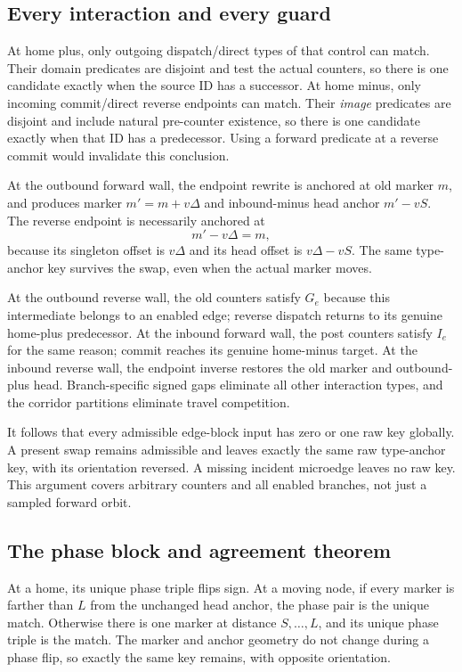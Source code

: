 \documentclass[11pt,a4paper]{article}
\numberwithin{equation}{section}
\begin{document}
\subsection{Every interaction and every guard}
At home plus, only outgoing dispatch/direct types of that control can match. Their domain predicates are disjoint and test the actual counters, so there is one candidate exactly when the source ID has a successor. At home minus, only incoming commit/direct reverse endpoints can match. Their \emph{image} predicates are disjoint and include natural pre-counter existence, so there is one candidate exactly when that ID has a predecessor. Using a forward predicate at a reverse commit would invalidate this conclusion.

At the outbound forward wall, the endpoint rewrite is anchored at old marker $m$, and produces marker $m'=m+v\Delta$ and inbound-minus head anchor $m'-vS$. The reverse endpoint is necessarily anchored at
\[
 m'-v\Delta=m,
\]
because its singleton offset is $v\Delta$ and its head offset is $v\Delta-vS$. The same type-anchor key survives the swap, even when the actual marker moves.

At the outbound reverse wall, the old counters satisfy $G_e$ because this intermediate belongs to an enabled edge; reverse dispatch returns to its genuine home-plus predecessor. At the inbound forward wall, the post counters satisfy $I_e$ for the same reason; commit reaches its genuine home-minus target. At the inbound reverse wall, the endpoint inverse restores the old marker and outbound-plus head. Branch-specific signed gaps eliminate all other interaction types, and the corridor partitions eliminate travel competition.

It follows that every admissible edge-block input has zero or one raw key globally. A present swap remains admissible and leaves exactly the same raw type-anchor key, with its orientation reversed. A missing incident microedge leaves no raw key. This argument covers arbitrary counters and all enabled branches, not just a sampled forward orbit.

\subsection{The phase block and agreement theorem}
At a home, its unique phase triple flips sign. At a moving node, if every marker is farther than $L$ from the unchanged head anchor, the phase pair is the unique match. Otherwise there is one marker at distance $S,\ldots,L$, and its unique phase triple is the match. The marker and anchor geometry do not change during a phase flip, so exactly the same key remains, with opposite orientation.
\end{document}
